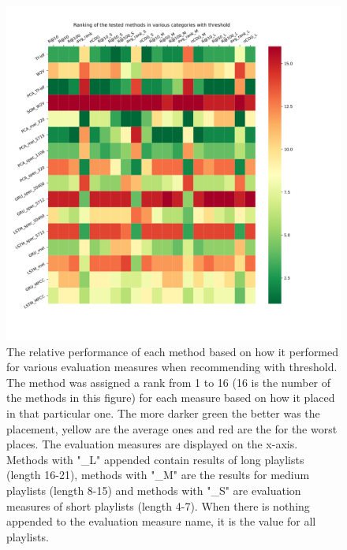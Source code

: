 \begin{figure}[H]
    \centering
	\includegraphics[width=1.3\linewidth]{./img/threshold_method_ranking.png}
	\caption{The relative performance of each method based on how it performed for various evaluation measures when recommending with threshold. The method was assigned a rank from 1 to 16 (16 is the number of the methods in this figure) for each measure based on how it placed in that particular one. The more darker green the better was the placement, yellow are the average ones and red are the for the worst places. The evaluation measures are displayed on the x-axis. Methods with "\_L" appended contain results of long playlists (length 16-21), methods with "\_M" are the results for medium playlists (length 8-15) and methods with "\_S" are evaluation measures of short playlists (length 4-7). When there is nothing appended to the evaluation measure name, it is the value for all playlists.}
	\label{fig:threshold_method_comparison}
\end{figure}

